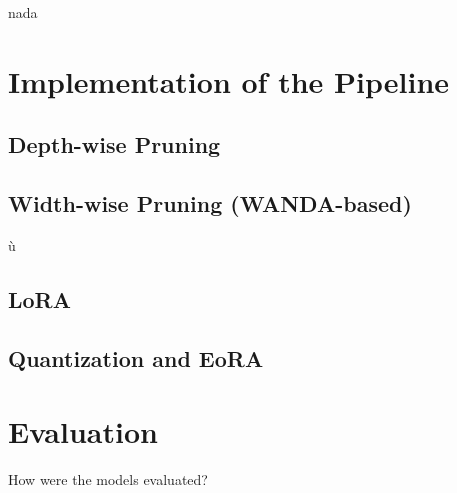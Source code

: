 nada

\section{Implementation of the Pipeline}
\subsection{Depth-wise Pruning}
\subsection{Width-wise Pruning (WANDA-based)}ù
\subsection{LoRA}
\subsection{Quantization and EoRA}

\section{Evaluation}
How were the models evaluated?